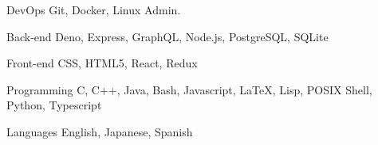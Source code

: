 

\begin{cvskills}

  \cvskill
    {DevOps} %
    {Git, Docker, Linux Admin.} %

  \cvskill
    {Back-end} %
    {Deno, Express, GraphQL, Node.js, PostgreSQL, SQLite} %

  \cvskill
    {Front-end} %
    {CSS, HTML5, React, Redux} %

  \cvskill
    {Programming} %
    {
        C,
        C++,
        Java,
        Bash,
        Javascript,
        \LaTeX,
        Lisp,
        POSIX Shell,
        Python,
        Typescript
    } %

  \cvskill
    {Languages} %
    {English, Japanese, Spanish} %

\end{cvskills}
